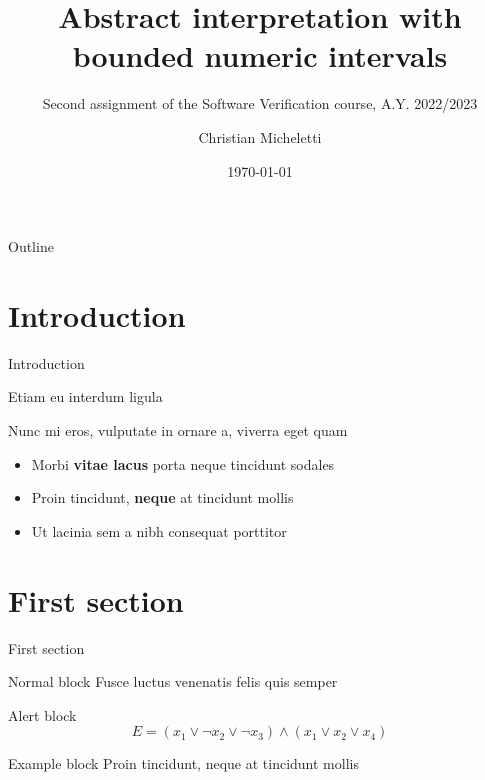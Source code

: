 \documentclass{beamer}
\title{Abstract interpretation with bounded numeric intervals}
\subtitle{Second assignment of the Software Verification course, A.Y. 2022/2023}
\author{Christian Micheletti}
\date{\today}
\begin{document}
	\maketitle

	\begin{frame}{Outline}
		\tableofcontents
	\end{frame}

    
	
	


	\section{Introduction}

	\begin{frame}{Introduction}

		Etiam eu interdum ligula

		Nunc mi eros, vulputate in ornare a, viverra eget quam \vspace{.5em}

		\begin{itemize}
			\item Morbi \textbf{vitae lacus} porta neque tincidunt sodales \vspace{.5em}
			\item Proin tincidunt, \textbf{neque} at tincidunt mollis \vspace{.5em}
			\item Ut \alert{lacinia sem a nibh} consequat porttitor
		\end{itemize}
	\end{frame}


	\section{First section}

	\begin{frame}{First section}
		\begin{block}{Normal block}
			Fusce luctus venenatis felis quis semper
		\end{block}

		\begin{alertblock}{Alert block}
			$$ E = (x_1 \vee \neg x_2 \vee \neg x_3) \wedge (x_1 \vee x_2 \vee x_4) $$
		\end{alertblock}

		\begin{exampleblock}{Example block}
			Proin tincidunt, neque at tincidunt mollis
		\end{exampleblock}
	\end{frame}
\end{document}

